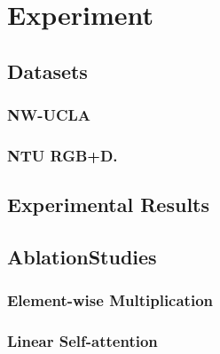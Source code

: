 \section{Experiment}

\subsection{Datasets}
\subsubsection{NW-UCLA}
\subsubsection{NTU RGB+D.}


\subsection{Experimental Results}


\subsection{AblationStudies}
\subsubsection{Element-wise Multiplication}
\subsubsection{Linear Self-attention}
